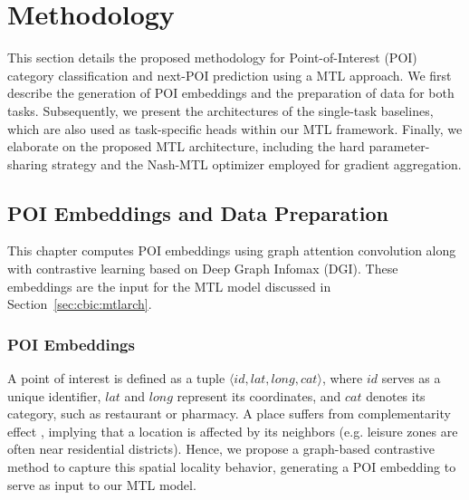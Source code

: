 \section{Methodology}
\label{sec:cbic:methodology}

This section details the proposed methodology for Point-of-Interest (POI) category classification and next-POI prediction using a MTL approach. We first describe the generation of POI embeddings and the preparation of data for both tasks. Subsequently, we present the architectures of the single-task baselines, which are also used as task-specific heads within our MTL framework. Finally, we elaborate on the proposed MTL architecture, including the hard parameter-sharing strategy and the Nash-MTL optimizer employed for gradient aggregation.

\subsection{POI Embeddings and Data Preparation}
\label{sec:cbic:embeddings}

This chapter computes POI embeddings using graph attention convolution along with contrastive learning based on Deep Graph Infomax (DGI). These embeddings are the input for the MTL model discussed in Section~\ref{sec:cbic:mtlarch}.

\subsubsection{POI Embeddings}

A point of interest is defined as a tuple $\langle id, lat, long, cat \rangle$, where $id$ serves as a unique identifier, $lat$ and $long$ represent its coordinates, and $cat$ denotes its category, such as restaurant or pharmacy. A place suffers from complementarity effect \cite{du2019beyond}, implying that a location is affected by its neighbors (e.g. leisure zones are often near residential districts). Hence, we propose a graph-based contrastive method to capture this spatial locality behavior, generating a POI embedding to serve as input to our MTL model.

